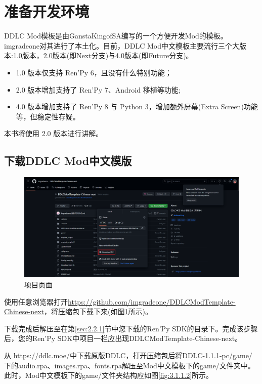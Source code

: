\section{准备开发环境}
DDLC Mod模板是由GanstaKingofSA编写的一个方便开发Mod的模板。imgradeone对其进行了本土化。目前，DDLC Mod中文模板主要流行三个大版本:1.0版本，2.0版本(即Next分支)与4.0版本(即Future分支)。
\begin{itemize}
    \item 1.0 版本仅支持 Ren'Py 6，且没有什么特别功能；
    \item 2.0 版本增加支持了 Ren'Py 7、Android 移植等功能;
    \item 4.0 版本增加支持了 Ren'Py 8 与 Python 3，增加额外屏幕(Extra Screen)功能等，但稳定性存疑。
\end{itemize}

本书将使用 2.0 版本进行讲解。

\subsection{下载DDLC Mod中文模版}
\label{2.1.1}

\begin{figure}[htb]
    \centering
    \includegraphics[scale=.15]{Pictures/2/2.1/2.1.1}
    \caption{项目页面}
    \label{fig:3.1.1.1}
\end{figure}
使用任意浏览器打开\url{https://github.com/imgradeone/DDLCModTemplate-Chinese-next}，将压缩包下载下来(如图\ref{fig:3.1.1.1}所示)。

下载完成后解压至在第\ref{sec:2.2.1}节中您下载的Ren'Py SDK的目录下。完成该步骤后，您的Ren'Py SDK中项目一栏应出现DDLCModTemplate-Chinese-next。

从 https://ddlc.moe/中下载原版DDLC，打开压缩包后将DDLC-1.1.1-pc/game/下的audio.rpa、images.rpa、fonts.rpa解压至Mod中文模板下的game/文件夹中。此时，Mod中文模板下的game/文件夹结构应如图\ref{fig:3.1.1.2}所示。

